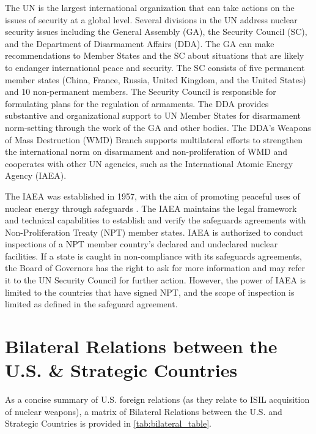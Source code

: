 \documentclass{report}
\begin{document}
The UN is the largest international organization that can take actions on the issues of security at a global level. Several divisions in the UN address nuclear security issues including the General Assembly (GA), the Security Council (SC), and the Department of Disarmament Affairs (DDA). The GA can make recommendations to Member States and the SC about situations that are likely to endanger international peace and security. The SC consists of five permanent member states (China, France, Russia, United Kingdom, and the United States) and 10 non-permanent members. The Security Council is responsible for formulating plans for the regulation of armaments. The DDA provides substantive and organizational support to UN Member States for disarmament norm-setting through the work of the GA and other bodies. The DDA's Weapons of Mass Destruction (WMD) Branch supports multilateral efforts to strengthen the international norm on disarmament and non-proliferation of WMD and cooperates with other UN agencies, such as the International Atomic Energy Agency (IAEA).

The IAEA was established in 1957, with the aim of promoting peaceful uses of nuclear energy through safeguards \cite{InternationalAtomicEnergyAgency}. The IAEA maintains the legal framework and technical capabilities to establish and verify the safeguards agreements with Non-Proliferation Treaty (NPT) member states. IAEA is authorized to conduct inspections of a NPT member country's declared and undeclared nuclear facilities. If a state is caught in non-compliance with its safeguards agreements, the Board of Governors has the right to ask for more information and may refer it to the UN Security Council for further action. However, the power of IAEA is limited to the countries that have signed NPT, and the scope of inspection is limited as defined in the safeguard agreement. 








\chapter[Appendix H: Bilateral Relations between the U.S. \& Strategic Countries]{Bilateral Relations between the U.S. \&  Strategic Countries} \label{app:relations_table}

As a concise summary of U.S. foreign relations (as they relate to ISIL acquisition of nuclear weapons), a matrix of Bilateral Relations between the U.S. and Strategic Countries is provided in \autoref{tab:bilateral_table}.
\end{document}
